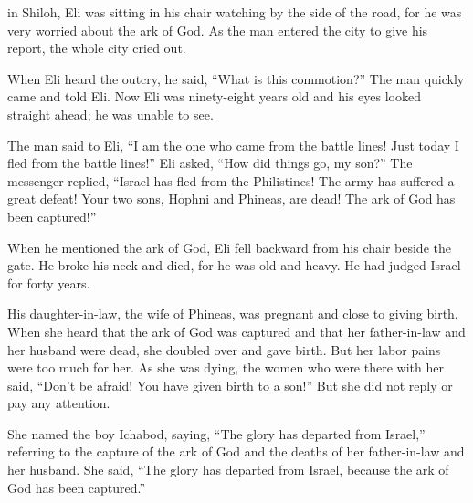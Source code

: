 {in Shiloh,
Eli
was sitting
in his chair
watching
by the side of the road,
for
he was
very worried
about the ark
of God.
As the man
entered
the city
to give his report,
the whole
city
cried out.
\par }{\PP {}When
Eli
heard
the outcry,
he said,
“What
is this
commotion?” The man
quickly
came
and told
Eli.
Now Eli
was ninety-eight
years
old
and his eyes
looked straight ahead;
he was unable
to see.
\par }{\PP {}The man
said
to
Eli,
“I am
the one who came
from
the battle lines! Just today
I
fled
from
the battle lines!” Eli asked,
“How
did things
go, my son?”
The messenger
replied,
“Israel
has fled
from
the Philistines! The army
has suffered
a great
defeat! Your two
sons,
Hophni
and Phineas,
are dead! The ark
of God
has been captured!”
\par }{\PP {}When
he mentioned
the ark
of God,
Eli fell
backward
from his chair
beside
the gate.
He broke
his neck
and died,
for
he was old
and heavy.
He
had judged
Israel
for forty
years.
\par }{\PP {}His daughter-in-law,
the wife
of Phineas,
was pregnant
and close to
giving birth.
When she heard
that the ark
of God
was captured
and that her father-in-law
and her husband
were dead,
she doubled over
and gave birth.
But her labor pains
were too much for her.
As she was dying,
the women who were there with her said, “Don’t
be afraid! You have given birth
to a son!” But she did not
reply
or
pay
any attention.
\par }{\PP {}She named
the boy
Ichabod,
saying,
“The glory
has departed from
Israel,”
referring to
the capture
of the ark
of God
and the deaths
of her father-in-law
and her husband.
She said,
“The glory
has departed
from Israel,
because
the ark
of God
has been captured.”

}
